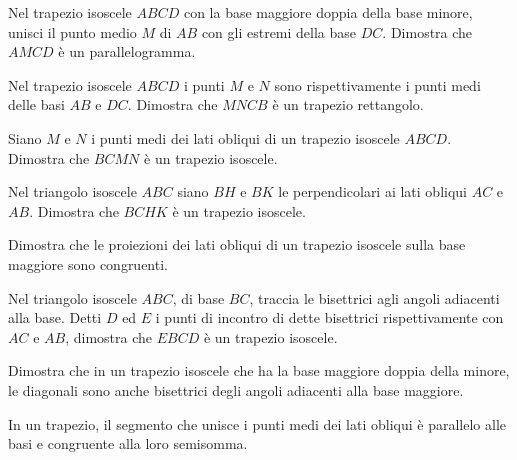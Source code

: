 \begin{multicols}{2}
\begin{esercizio}
\label{ese:4.28}
Nel trapezio isoscele $ABCD$ con la base maggiore doppia della base 
minore, unisci il punto medio $M$ di $AB$ con gli estremi della base 
$DC$. Dimostra che $AMCD$ è un parallelogramma.
\end{esercizio}

\begin{esercizio}
\label{ese:4.29}
Nel trapezio isoscele $ABCD$ i punti $M$ e $N$ sono rispettivamente i 
punti medi delle basi $AB$ e $DC$. Dimostra che $MNCB$ è un trapezio 
rettangolo.
\end{esercizio}

\begin{esercizio}
\label{ese:4.30}
Siano $M$ e $N$ i punti medi dei lati obliqui di un trapezio isoscele 
$ABCD$. Dimostra che $BCMN$ è un trapezio isoscele.
\end{esercizio}

\begin{esercizio}
\label{ese:4.31}
Nel triangolo isoscele $ABC$ siano $BH$ e $BK$ le perpendicolari ai 
lati obliqui $AC$ e $AB$. Dimostra che $BCHK$ è un trapezio isoscele.
\end{esercizio}

\begin{esercizio}
\label{ese:4.32}
Dimostra che le proiezioni dei lati obliqui di un trapezio isoscele 
sulla base maggiore sono congruenti.
\end{esercizio}

\begin{esercizio}
\label{ese:4.33}
Nel triangolo isoscele $ABC$, di base $BC$, traccia le bisettrici 
agli angoli adiacenti alla base. Detti $D$ ed $E$ i punti di incontro 
di dette bisettrici rispettivamente con $AC$ e $AB$, dimostra che 
$EBCD$ è un trapezio isoscele.
\end{esercizio}

\begin{esercizio}
\label{ese:4.34}
Dimostra che in un trapezio isoscele che ha la base maggiore doppia 
della minore, le diagonali sono anche bisettrici degli angoli 
adiacenti alla base maggiore.
\end{esercizio}

\begin{esercizio}
\label{ese:4.35}
In un trapezio, il segmento che unisce i punti medi dei lati obliqui 
è parallelo alle basi e congruente alla loro semisomma.
\end{esercizio}


\end{multicols}
